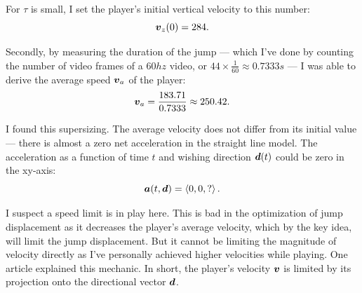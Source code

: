 For $\tau$ is small, I set the player's initial vertical velocity to this number:
\[
    \boldsymbol{v}_{z}(0) = 284.
\]

Secondly, by measuring the duration of the jump --- which I've done by counting the number of video frames of a $60\si{hz}$ video, or $44 \times \frac{1}{60} \approx 0.7333 \si{s}$ --- I was able to derive the average speed $\boldsymbol{v}_{a}$ of the player:
\[
    \boldsymbol{v}_{a} = \frac{183.71}{0.7333} \approx 250.42.
\]

I found this supersizing. The average velocity does not differ from its initial value --- there is almost a zero net acceleration in the straight line model. The acceleration as a function of time $t$ and wishing direction $\boldsymbol{d}(t)$ could be zero in the xy-axis:
\[
    \boldsymbol{a}(t, \boldsymbol{d}) = \left\langle 0, 0, ? \right\rangle.
\]

I suspect a speed limit is in play here. This is bad in the optimization of jump displacement as it decreases the player's average velocity, which by the key idea, will limit the jump displacement. But it cannot be limiting the magnitude of velocity directly as I've personally achieved higher velocities while playing. One article explained this mechanic. In short, the player's velocity $\boldsymbol{v}$ is limited by its projection onto the directional vector $\boldsymbol{d}$.

